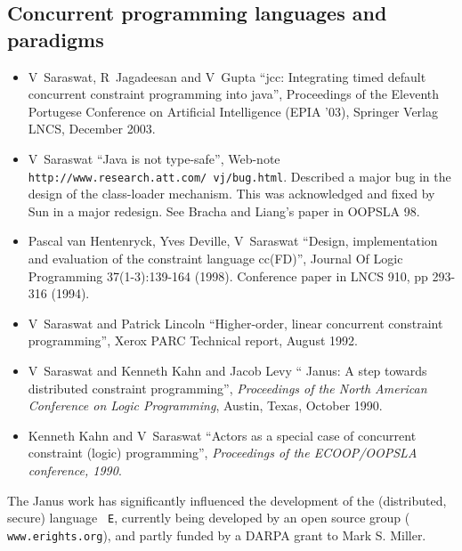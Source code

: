 \documentclass{article}
\begin{document}
\subsection*{Concurrent programming languages and paradigms}
\begin{itemize} 

\item V~Saraswat, R~Jagadeesan and V~Gupta ``jcc:
   Integrating timed default concurrent constraint programming into
   java'', Proceedings of the Eleventh Portugese Conference on
   Artificial Intelligence (EPIA '03), Springer Verlag LNCS, December
   2003.

\item V~Saraswat ``Java is not type-safe'', Web-note
  \texttt{http://www.research.att.com/~vj/bug.html}. Described a major
  bug in the design of the class-loader mechanism. This was
  acknowledged and fixed by Sun in a major redesign. See Bracha and
  Liang's paper in OOPSLA 98.

\item Pascal van Hentenryck, Yves Deville, V~Saraswat ``Design,
    implementation and evaluation of the constraint language cc(FD)'',
    Journal Of Logic Programming 37(1-3):139-164 (1998). Conference
    paper in LNCS 910, pp 293-316 (1994).

\item V~Saraswat and Patrick Lincoln ``Higher-order, linear
    concurrent constraint programming'', Xerox PARC Technical report,
    August 1992.

\item V~Saraswat and Kenneth Kahn and Jacob Levy ``\textsf{
    Janus}: A step towards distributed constraint programming'', \textit{
    Proceedings of the North American Conference on Logic
    Programming}, Austin, Texas, October 1990.

\item    Kenneth Kahn and V~Saraswat ``Actors as a special
    case of concurrent constraint (logic) programming'', \textit{
    Proceedings of the ECOOP/OOPSLA conference, 1990}.


\end{itemize}

The \textsf{Janus} work has significantly influenced the development of
the (distributed, secure) language \texttt{ E}, currently being developed
by an open source group (\texttt{ www.erights.org}), and partly funded by
a DARPA grant to Mark S. Miller.
\end{document}
